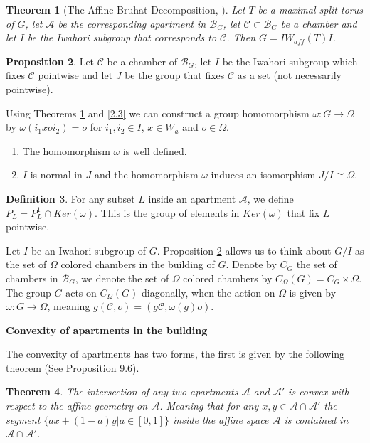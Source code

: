 \documentclass[12pt]{article}
\newcommand{\A}{\mathcal{A}}
\newcommand{\B}{\mathcal{B}}
\newcommand{\C}{\mathcal{C}}
\newcommand{\<}{\langle}
\renewcommand{\>}{\rangle}
\theoremstyle{plain}
\newtheorem{theorem}{Theorem}[section] %
\theoremstyle{definition}
\newtheorem{prop}[theorem]{Proposition}
\newtheorem{defn}[theorem]{Definition} %
\begin{document}
\begin{theorem}[The Affine Bruhat Decomposition, \cite{PMIHES_1965__25__5_0}]\label{affine bruhat decomposition}
Let $T$ be a maximal split torus of $G$, let $\A$ be the corresponding apartment in $\B_G$, let $\C\subset\B_G$ be a chamber and let $I$ be the Iwahori subgroup that corresponds to $\C$. Then $G=IW_{aff}(T)I$.
\end{theorem}

\begin{prop}\label{2.12}
Let $\C$ be a chamber of $\B_G$, let $I$ be the Iwahori subgroup which fixes $\C$ pointwise and let $J$ be the group that fixes $\C$ as a set (not necessarily pointwise).

    Using Theorems \ref{affine bruhat decomposition} and \ref{2.3} we can construct a group homomorphism $\omega:G\rightarrow\Omega$ by $\omega(i_1xoi_2)=o$ for $i_1,i_2\in I$, $x\in W_a$ and $o\in \Omega$.
    \begin{enumerate}
        \item The homomorphism $\omega$ is well defined.
        \item $I$ is normal in $J$ and the homomorphism $\omega$ induces an isomorphism $J/I\cong \Omega$.
    \end{enumerate}
\end{prop}


\begin{defn}
    For any subset $L$ inside an apartment $\A$, we define $P_L=P^1_L\cap Ker(\omega)$. This is the group of elements in $Ker(\omega)$ that fix $L$ pointwise.
\end{defn}

Let $I$ be an Iwahori subgroup of $G$. Proposition \ref{2.12} allows us to think about $G/I$ as the set of $\Omega$ colored chambers in the building of $G$. Denote by $C_G$ the set of chambers in $\B_G$, we denote the set of $\Omega$ colored chambers by $C_\Omega(G)=C_G\times \Omega$. The group $G$ acts on $C_\Omega(G)$ diagonally, when the action on $\Omega$ is given by $\omega:G\rightarrow \Omega$, meaning $g(\C,o)=(g\C,\omega(g)o)$.

\textbf{Convexity of apartments in the building}

The convexity of apartments has two forms, the first is given by the following theorem (See \cite{Landvogt1995ACO} Proposition 9.6).

\begin{theorem}\label{2.13}
The intersection of any two apartments $\A$ and $\A'$ is convex with respect to the affine geometry on $\A$. Meaning that for any $x,y\in \A\cap \A'$ the segment $\{ax+(1-a)y|a\in [0,1]\}$ inside the affine space $\A$ is contained in $\A\cap \A'$. 
\end{theorem}
\end{document}
